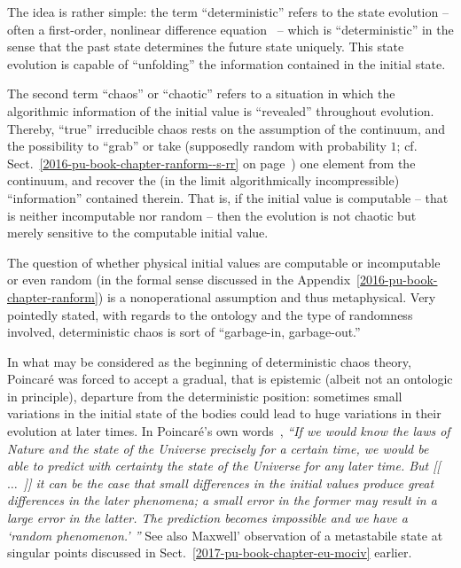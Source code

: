 The idea is rather simple: the term ``deterministic'' refers to the state evolution
-- often a first-order, nonlinear difference equation~\cite{may1} -- which is
``deterministic'' in the sense that the past state determines the future state uniquely.
This  state evolution is capable of ``unfolding'' the information contained in the initial state.

The second term ``chaos''
or ``chaotic'' refers to a situation in which the algorithmic information of the initial value is ``revealed'' throughout
evolution.
Thereby, ``true'' irreducible chaos rests on the assumption of the continuum,
and the possibility to ``grab'' or take (supposedly random with probability $1$; cf. Sect.~\ref{2016-pu-book-chapter-ranform--s-rr}
on page~\pageref{2016-pu-book-chapter-ranform--s-rr}) one element from the continuum,
and recover the (in the limit algorithmically incompressible) ``information'' contained therein.
That is, if the initial value is computable -- that is neither incomputable nor random
--
then the evolution is not chaotic but merely sensitive to the computable initial value.

The question of whether physical initial values are computable or incomputable or even random
(in the formal sense discussed in the Appendix~\ref{2016-pu-book-chapter-ranform})
is a nonoperational assumption and thus metaphysical.
Very pointedly stated, with regards to the ontology and the type of randomness involved, deterministic chaos is sort of
``garbage-in, garbage-out.''


In what may be considered as the beginning of deterministic chaos theory,
Poincar{\'e} was forced to accept a gradual, that is epistemic
(albeit  not an ontologic in principle), departure from the deterministic position:
sometimes small
variations in the initial state of the bodies could lead to huge variations in their
evolution at later times.
In Poincar{\'e}'s own words~\cite[Chapter~4, Sect.~II, pp.~56-57]{poincare14},
{\em
``If we would know the laws of Nature and the state of the Universe precisely
for a certain time,
we would be able to predict with certainty
the state of the Universe for any later time.
But
[[~$\ldots$~]]
it can be the case that small differences in the initial values
produce great differences in the later phenomena;
a small error in the former may result in a large error in the latter.
The prediction becomes impossible and we have a `random phenomenon.'
''}
See also Maxwell' observation of a metastabile state at singular points discussed
in Sect.~\ref{2017-pu-book-chapter-eu-mociv} earlier.

